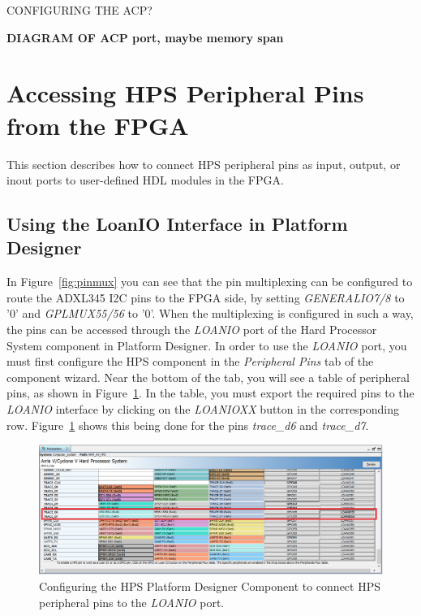 \documentclass[11pt, twoside, pdftex]{article}
\begin{document}
CONFIGURING THE ACP?

\textbf{DIAGRAM OF ACP port, maybe memory span}
\fi

\section{Accessing HPS Peripheral Pins from the FPGA}

This section describes how to connect HPS peripheral pins as input, output, or inout ports to user-defined HDL modules in the FPGA. 

\subsection{Using the LoanIO Interface in Platform Designer}
\label{sec:loanio_qsys}

In Figure~\ref{fig:pinmux} you can see that the pin multiplexing can be configured to route the ADXL345 I2C pins to the FPGA side, by setting \textit{GENERALIO7/8} to '0' and \textit{GPLMUX55/56} to '0'. When the multiplexing is configured in such a way, the pins can be accessed through the \textit{LOANIO} port of the Hard Processor System component in Platform Designer. In order to use the \textit{LOANIO} port, you must first configure the HPS component in the \textit{Peripheral Pins} tab of the component wizard. Near the bottom of the tab, you will see a table of peripheral pins, as shown in Figure~\ref{fig:loanio_table}. In the table, you must export the required pins to the \textit{LOANIO} interface by clicking on the \textit{LOANIOXX} button in the corresponding row. Figure~\ref{fig:loanio_table} shows this being done for the pins \textit{trace\_d6} and \textit{trace\_d7}. 

\begin{figure} [H]
\begin{center}
\includegraphics[scale = 0.5]{figures/fig_qsys_hps_loanio.png}
\end{center}
\caption{Configuring the HPS Platform Designer Component to connect HPS peripheral pins to the \textit{LOANIO} port.}
\label{fig:loanio_table}
\end{figure}
\end{document}
